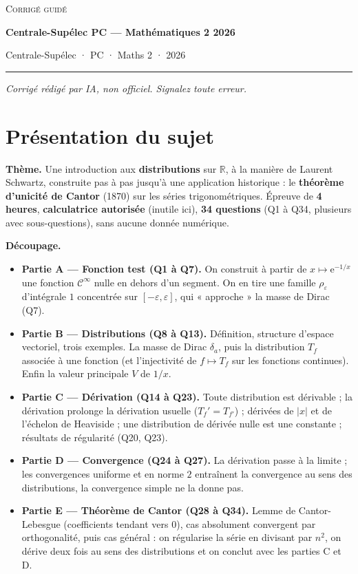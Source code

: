 \documentclass[11pt,a4paper]{article}
\providecommand{\tightlist}{\setlength{\itemsep}{0pt}\setlength{\parskip}{0pt}}
\begin{document}
\thispagestyle{plain}
\begin{center}
  {\small\scshape Corrigé guidé}\par\smallskip
  {\LARGE\bfseries Centrale-Supélec PC — Mathématiques 2 2026\par}\medskip
  {\large Centrale-Supélec · PC · Maths 2 · 2026\par}
\end{center}
\vspace{2pt}\hrule\vspace{8pt}

\emph{Corrigé rédigé par IA, non officiel. Signalez toute erreur.}

\hypertarget{pruxe9sentation-du-sujet}{%
\section{Présentation du sujet}\label{pruxe9sentation-du-sujet}}

\textbf{Thème.} Une introduction aux \textbf{distributions} sur \(\mathbb R\), à la manière de Laurent Schwartz, construite pas à pas jusqu'à une application historique : le \textbf{théorème d'unicité de Cantor} (1870) sur les séries trigonométriques. Épreuve de \textbf{4 heures}, \textbf{calculatrice autorisée} (inutile ici), \textbf{34 questions} (Q1 à Q34, plusieurs avec sous-questions), sans aucune donnée numérique.

\textbf{Découpage.}

\begin{itemize}
\tightlist
\item
  \textbf{Partie A --- Fonction test (Q1 à Q7).} On construit à partir de \(x\mapsto\mathrm e^{-1/x}\) une fonction \(\mathcal C^\infty\) nulle en dehors d'un segment. On en tire une famille \(\rho_\varepsilon\) d'intégrale \(1\) concentrée sur \([-\varepsilon,\varepsilon]\), qui « approche » la masse de Dirac (Q7).
\item
  \textbf{Partie B --- Distributions (Q8 à Q13).} Définition, structure d'espace vectoriel, trois exemples. La masse de Dirac \(\delta_a\), puis la distribution \(T_f\) associée à une fonction (et l'injectivité de \(f\mapsto T_f\) sur les fonctions continues). Enfin la valeur principale \(V\) de \(1/x\).
\item
  \textbf{Partie C --- Dérivation (Q14 à Q23).} Toute distribution est dérivable ; la dérivation prolonge la dérivation usuelle (\(T_f'=T_{f'}\)) ; dérivées de \(|x|\) et de l'échelon de Heaviside ; une distribution de dérivée nulle est une constante ; résultats de régularité (Q20, Q23).
\item
  \textbf{Partie D --- Convergence (Q24 à Q27).} La dérivation passe à la limite ; les convergences uniforme et en norme \(2\) entraînent la convergence au sens des distributions, la convergence simple ne la donne pas.
\item
  \textbf{Partie E --- Théorème de Cantor (Q28 à Q34).} Lemme de Cantor-Lebesgue (coefficients tendant vers \(0\)), cas absolument convergent par orthogonalité, puis cas général : on régularise la série en divisant par \(n^2\), on dérive deux fois au sens des distributions et on conclut avec les parties C et D.
\end{itemize}
\end{document}
